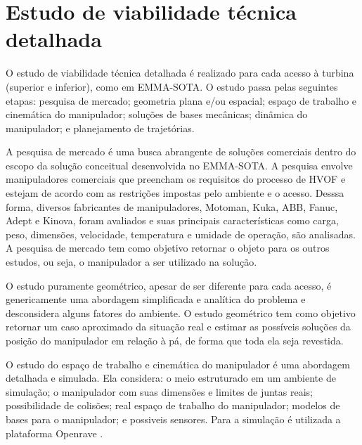 \section{Estudo de viabilidade técnica detalhada}\label{sec::viatec}
O estudo de viabilidade técnica detalhada é realizado para cada acesso à turbina
(superior e inferior), como em EMMA-SOTA. O estudo passa pelas
seguintes etapas: pesquisa de mercado; geometria plana e/ou espacial; espaço de
trabalho e cinemática do manipulador; soluções de bases mecânicas; dinâmica do manipulador; e planejamento de trajetórias.

A pesquisa de mercado é uma busca abrangente de soluções comerciais dentro do
escopo da solução conceitual desenvolvida no EMMA-SOTA. A pesquisa envolve
manipuladores comerciais que preencham os requisitos do processo de HVOF e
estejam de acordo com as restrições impostas pelo ambiente e o acesso. Desssa
forma, diversos fabricantes de manipuladores, Motoman, Kuka, ABB, Fanuc,
Adept e Kinova, foram avaliados e suas principais características como carga,
peso, dimensões, velocidade, temperatura e umidade de operação, são analisadas.
A pesquisa de mercado tem como objetivo retornar o objeto para os outros
estudos, ou seja, o manipulador a ser utilizado na solução.

O estudo puramente geométrico, apesar de ser diferente para cada acesso, é
genericamente uma abordagem simplificada e analítica do problema e desconsidera
alguns fatores do ambiente. O estudo geométrico tem como objetivo retornar um caso
aproximado da situação real e estimar as possíveis soluções da posição do
manipulador em relação à pá, de forma que toda ela seja revestida.

O estudo do espaço de trabalho e cinemática do manipulador é uma abordagem
detalhada e simulada. Ela considera: o meio estruturado em um ambiente de
simulação; o manipulador com suas dimensões e limites de juntas reais;
possibilidade de colisões; real espaço de trabalho do manipulador; modelos de
bases para o manipulador; e possiveis sensores. Para a simulação é utilizada a
plataforma Openrave \citep{diankov2008openrave}. 


